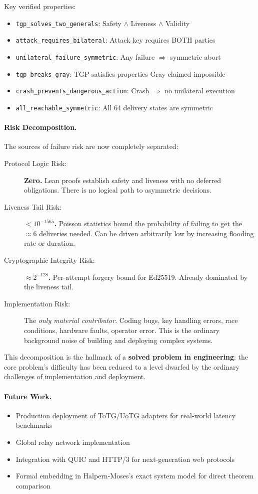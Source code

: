\noindent Key verified properties:
\begin{itemize}
    \item \texttt{tgp\_solves\_two\_generals}: Safety $\land$ Liveness $\land$ Validity
    \item \texttt{attack\_requires\_bilateral}: Attack key requires BOTH parties
    \item \texttt{unilateral\_failure\_symmetric}: Any failure $\Rightarrow$ symmetric abort
    \item \texttt{tgp\_breaks\_gray}: TGP satisfies properties Gray claimed impossible
    \item \texttt{crash\_prevents\_dangerous\_action}: Crash $\Rightarrow$ no unilateral execution
    \item \texttt{all\_reachable\_symmetric}: All 64 delivery states are symmetric
\end{itemize}

\paragraph{Risk Decomposition.}
The sources of failure risk are now completely separated:

\begin{description}
    \item[Protocol Logic Risk:] \textbf{Zero.} Lean proofs establish safety and liveness with no deferred obligations. There is no logical path to asymmetric decisions.
    \item[Liveness Tail Risk:] \textbf{$< 10^{-1565}$.} Poisson statistics bound the probability of failing to get the $\approx 6$ deliveries needed. Can be driven arbitrarily low by increasing flooding rate or duration.
    \item[Cryptographic Integrity Risk:] \textbf{$\approx 2^{-128}$.} Per-attempt forgery bound for Ed25519. Already dominated by the liveness tail.
    \item[Implementation Risk:] The \emph{only material contributor}. Coding bugs, key handling errors, race conditions, hardware faults, operator error. This is the ordinary background noise of building and deploying complex systems.
\end{description}

This decomposition is the hallmark of a \textbf{solved problem in engineering}: the core problem's difficulty has been reduced to a level dwarfed by the ordinary challenges of implementation and deployment.

\paragraph{Future Work.}
\begin{itemize}
    \item Production deployment of ToTG/UoTG adapters for real-world latency benchmarks
    \item Global relay network implementation
    \item Integration with QUIC and HTTP/3 for next-generation web protocols
    \item Formal embedding in Halpern-Moses's exact system model for direct theorem comparison
\end{itemize}

